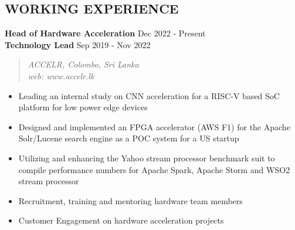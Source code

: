 \documentclass[mm]{res} %
\begin{document}
\begin{resume}

\section{WORKING EXPERIENCE}

\textbf{Head of Hardware Acceleration} \hfill Dec 2022 - Present\\
\textbf{Technology Lead} \hfill Sep 2019 - Nov 2022
\begin{quote}
	\emph{ACCELR, Colombo, Sri Lanka \\
		web: www.accelr.lk}
\end{quote}
\begin{itemize} \itemsep -1pt 
\item Leading an internal study on CNN acceleration for a RISC-V based SoC platform for low power edge devices
\item Designed and implemented an FPGA accelerator (AWS F1) for the Apache Solr/Lucene search engine as a POC system for a US startup
\item Utilizing and enhancing the Yahoo stream processor benchmark suit to compile performance numbers for  Apache Spark, Apache Storm and WSO2 stream processor
\item Recruitment, training and mentoring hardware team members
\item Customer Engagement on hardware acceleration projects


\end{itemize}
\end{resume}
\end{document}
